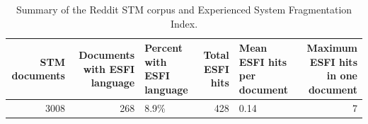\begin{table}

\caption{Summary of the Reddit STM corpus and Experienced System Fragmentation Index.}
\centering
\begin{tabular}[t]{rrlrlr}
\toprule
STM documents & Documents with ESFI language & Percent with ESFI language & Total ESFI hits & Mean ESFI hits per document & Maximum ESFI hits in one document\\
\midrule
3008 & 268 & 8.9\% & 428 & 0.14 & 7\\
\bottomrule
\end{tabular}
\end{table}
